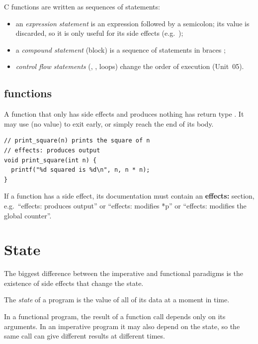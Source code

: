 C functions are written as sequences of statements:
\begin{itemize}
  \item an \emph{expression statement} is an expression followed by a semicolon; its value is
    discarded, so it is only useful for its side effects (e.g.\ );
  \item a \emph{compound statement} (block) is a sequence of statements in braces
    ;
  \item \emph{control flow statements} (, , loops) change the order of
    execution (Unit~05).
\end{itemize}

\subsection{ functions}

A function that only has side effects and produces nothing has return type . It may
use  (no value) to exit early, or simply reach the end of its body.
\begin{lstlisting}[style=c]
// print_square(n) prints the square of n
// effects: produces output
void print_square(int n) {
  printf("%d squared is %d\n", n, n * n);
}
\end{lstlisting}

\begin{important}
If a function has a side effect, its documentation must contain an \textbf{effects:} section,
e.g.\ ``effects: produces output'' or ``effects: modifies *p'' or ``effects: modifies the
global counter''.
\end{important}

\section{State}

The biggest difference between the imperative and functional paradigms is the existence of side
effects that change the state.

\begin{definition}
The \emph{state} of a program is the value of all of its data at a moment in time.
\end{definition}

In a functional program, the result of a function call depends only on its arguments. In an
imperative program it may also depend on the state, so the same call can give different results
at different times.

